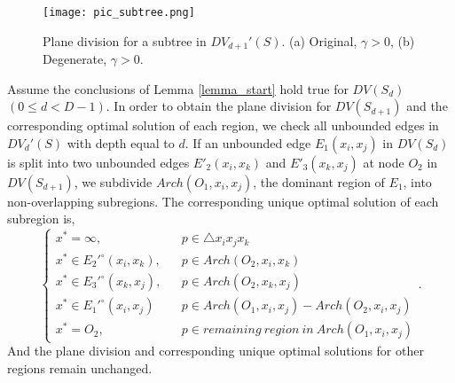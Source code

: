 \documentclass[final,3p,times]{elsarticle}
\begin{document}
\begin{figure}
  \centering
  \texttt{[image: pic\_subtree.png]}
  \caption{Plane division for a subtree in $DV_{d+1}'(S)$. (a) Original, $\gamma>0$, (b) Degenerate, $\gamma>0$.}
  \label{pic_cf_second_primary_case}
\end{figure}

\begin{Lemma}
\label{lemma_deductive}
Assume the conclusions of Lemma \ref{lemma_start} hold true for $DV(S_d)$ $(0\leq d < D-1)$. In order to obtain the plane division for $DV(S_{d+1})$ and the corresponding optimal solution of each region, we check all unbounded edges in $DV_d'(S)$ with depth equal to $d$. If an unbounded edge $E_1(x_i,x_j)$ in $DV(S_d)$ is split into two unbounded edges $E'_2(x_i,x_k)$ and $E'_3(x_k,x_j)$ at node $O_2$ in $DV(S_{d+1})$, we subdivide $Arch(O_1,x_i,x_j)$, the dominant region of $E_1$, into non-overlapping subregions. The corresponding unique optimal solution of each subregion is,
\begin{equation}
\left\{
\begin{array}{lcl}
x^*=\infty,          & & p \in \triangle x_ix_jx_k  \\
x^*\in E_2'^\circ(x_i,x_k),  & & p \in Arch(O_2,x_i,x_k)  \\
x^*\in E_3'^\circ(x_k,x_j),  & & p \in Arch(O_2,x_k,x_j)  \\
x^*\in E_1'^\circ(x_i,x_j) & & p \in Arch(O_1,x_i,x_j)-Arch(O_2,x_i,x_j) \\
x^*=O_2,             & & p \in remaining\ region\ in\ Arch(O_1,x_i,x_j)
\end{array}\right..
\label{eq_centerfunction_altered}
\end{equation}
And the plane division and corresponding unique optimal solutions for other regions remain unchanged.
\end{Lemma}
\end{document}
